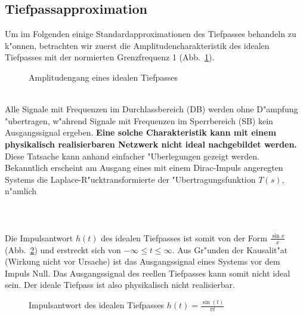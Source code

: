 \subsection{Tiefpassapproximation}
Um im Folgenden einige Standardapproximationen des Tiefpasses behandeln zu
k"onnen, betrachten wir zuerst die Amplitudencharakteristik des idealen
Tiefpasses mit der normierten Grenzfrequenz 1 (Abb.~\ref{amp-id}).
\begin{figure}[!htb]
\begin{center}
  \caption{Amplitudengang eines idealen Tiefpasses \label{amp-id}}
\end{center}
\vspace*{-6mm}
\end{figure}~\\
Alle Signale mit Frequenzen im Durchlassbereich (DB) werden ohne
D"ampfung "ubertragen, w"ahrend Signale mit Frequenzen im Sperrbereich
(SB) kein Ausgangssignal ergeben.  {\bf Eine solche Charakteristik
  kann mit einem physikalisch realisierbaren Netzwerk nicht ideal
  nachgebildet werden.}  Diese Tatsache kann anhand einfacher
"Uberlegungen gezeigt werden. Bekanntlich erscheint am Ausgang eines
mit einem Dirac-Impuls angeregten Systems die Laplace-R"ucktransformierte
der "Ubertragungsfunktion $T(s)$, n"amlich\\~\\
\\~~\\
\nit Die Impulsantwort $h(t)$ des idealen Tiefpasses ist
somit von der Form $\frac{\sin{x}}{x}$ (Abb.~\ref{stoss-id}) und erstreckt
sich von $-\infty \leq t \leq \infty$. Aus Gr"unden der
Kausalit"at (Wirkung nicht vor Ursache) ist das
Ausgangssignal eines Systems vor dem Impuls Null. Das Ausgangssignal
des reellen Tiefpasses kann somit nicht ideal sein. Der ideale
Tiefpass ist also physikalisch nicht
realisierbar.

\begin{figure}[!htb] %
\vspace*{-4mm}
\begin{center}
\vspace*{-3mm}
\caption{Impulsantwort des idealen Tiefpasses $h(t)=\frac{\sin(t)}{\pi t}$\label{stoss-id}}   
\end{center}
\vspace*{-12mm}
\end{figure}~\\

